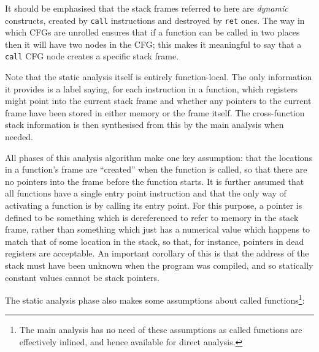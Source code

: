 It should be emphasised that the stack frames referred to here are
\emph{dynamic} constructs, created by \verb|call| instructions and
destroyed by \verb|ret| ones.  The way in which CFGs are unrolled
ensures that if a function can be called in two places then it will
have two nodes in the CFG; this makes it meaningful to say that a
\verb|call| CFG node creates a specific stack frame.

Note that the static analysis itself is entirely function-local.  The
only information it provides is a label saying, for each instruction
in a function, which registers might point into the current stack
frame and whether any pointers to the current frame have been stored
in either memory or the frame itself.  The cross-function stack
information is then synthesised from this by the main analysis when
needed.

\label{sect:function_head}
All phases of this analysis algorithm make one key assumption: that
the locations in a function's frame are ``created'' when the function
is called, so that there are no pointers into the frame before the
function starts.  It is further assumed that all functions have a
single entry point instruction and that the only way of activating a
function is by calling its entry point.  For this purpose, a pointer
is defined to be something which is dereferenced to refer to memory in
the stack frame, rather than something which just has a numerical
value which happens to match that of some location in the stack, so
that, for instance, pointers in dead registers are acceptable.  An
important corollary of this is that the address of the stack must have
been unknown when the program was compiled, and so statically constant
values cannot be stack pointers.

The static analysis phase also makes some assumptions about called
functions\footnote{The main analysis has no need of these assumptions
  as called functions are effectively inlined, and hence available for
  direct analysis.}:

